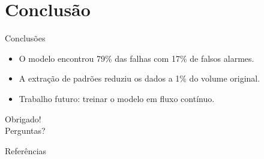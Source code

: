 \documentclass[11pt,aspectratio=169]{beamer}
\newif\ifinstrucoes
\newcommand{\instrucao}[1]{\ifinstrucoes\par\vfill{\color{gray}\scriptsize\itshape #1\par}\fi}
\begin{document}
\section{Conclusão}
\begin{frame}{Conclusões}
  \begin{itemize}
    \item O modelo encontrou 79\% das falhas com 17\% de falsos alarmes.
    \item A extração de padrões reduziu os dados a 1\% do volume original.
    \item \alert{Trabalho futuro:} treinar o modelo em fluxo contínuo.
  \end{itemize}
  \instrucao{Responda à pergunta de pesquisa com números, diga uma limitação e um próximo passo.}
\end{frame}

\begin{frame}[standout]
  Obrigado!\\[6pt]
  {\normalsize Perguntas?}
\end{frame}

\begin{frame}{Referências}
  \nocite{cormen2009, knuth1998}
  \small
  
  
\end{frame}
\end{document}
